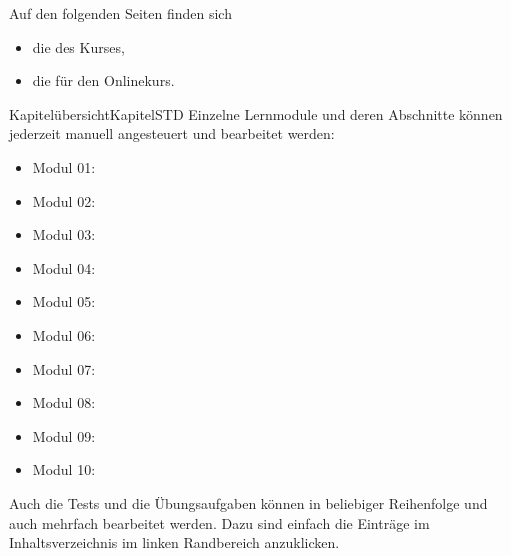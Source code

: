 

\ifttm
\MSetSubject{\MINTPhysics}

\begin{MSectionStart}
Auf den folgenden Seiten finden sich
\begin{itemize}
\item{die  des Kurses,}
\item{die  für den Onlinekurs.}
\end{itemize}
\end{MSectionStart}


\begin{MXContent}{Kapitelübersicht}{Kapitel}{STD}
\MGlobalChapterTag
Einzelne Lernmodule und deren Abschnitte können jederzeit manuell angesteuert und bearbeitet werden:
\begin{itemize}
\item{Modul 01: }
\item{Modul 02: }
\item{Modul 03: }
\item{Modul 04: }
\item{Modul 05: }
\item{Modul 06: }
\item{Modul 07: }
\item{Modul 08: }
\item{Modul 09: }
\item{Modul 10: }
\end{itemize}
Auch die Tests und die Übungsaufgaben können in beliebiger Reihenfolge und auch mehrfach bearbeitet werden.
Dazu sind einfach die Einträge im Inhaltsverzeichnis im linken Randbereich anzuklicken.
\end{MXContent}


